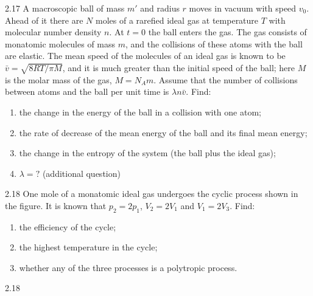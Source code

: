 \begin{problem}{2.17}
A macroscopic ball of mass $m'$ and radius $r$ moves in vacuum with speed $v_0$. Ahead of it there are $N$ moles of a rarefied ideal gas at temperature $T$ with molecular number density $n$. At $t = 0$ the ball enters the gas. The gas consists of monatomic molecules of mass $m$, and the collisions of these atoms with the ball are elastic. The mean speed of the molecules of an ideal gas is known to be $\bar v = \sqrt{8RT/\pi M}$, and it is much greater than the initial speed of the ball; here $M$ is the molar mass of the gas, $M = N_A m$. Assume that the number of collisions between atoms and the ball per unit time is $\lambda n\bar v$. Find:
\begin{enumerate}[label=(\arabic*),leftmargin=2.2em,itemsep=1pt,topsep=2pt]
\item the change in the energy of the ball in a collision with one atom;
\item the rate of decrease of the mean energy of the ball and its final mean energy;
\item the change in the entropy of the system (the ball plus the ideal gas);
\item $\lambda = ?$ (additional question)
\end{enumerate}
\end{problem}

\begin{problem}{2.18}
One mole of a monatomic ideal gas undergoes the cyclic process shown in the figure. It is known that $p_2 = 2p_1$, $V_2 = 2V_1$ and $V_1 = 2V_3$. Find:
\begin{enumerate}[label=(\arabic*),leftmargin=2.2em,itemsep=1pt,topsep=2pt]
\item the efficiency of the cycle;
\item the highest temperature in the cycle;
\item whether any of the three processes is a polytropic process.
\end{enumerate}
\end{problem}

\begin{figbox}{2.18}
\end{figbox}

